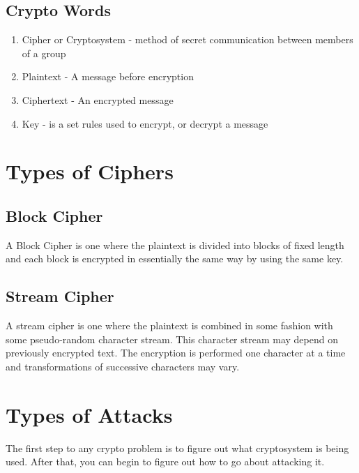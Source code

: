 \documentclass{report}
\begin{document}
\subsection{Crypto Words}
\begin{enumerate}
\item \color{blue}Cipher \color{black} or \color{blue}Cryptosystem \color{black} - method of secret communication between members of a group\newline
\item \color{blue}Plaintext \color{black} - A message before encryption\newline
\item \color{blue}Ciphertext \color{black} - An encrypted message\newline
\item \color{blue}Key \color{black} - is a set rules used to encrypt, or decrypt a message\newline
\end{enumerate}

\section{Types of Ciphers}
\subsection{Block Cipher}
A \color{blue}Block Cipher \color{black} is one where the plaintext is divided into blocks of fixed length and each block is encrypted in essentially the same way by using the same key.\newline
\newline
\subsection{Stream Cipher}
A \color{blue}stream cipher \color{black} is one where the plaintext is combined in some fashion with some pseudo-random character stream. This character stream may depend on previously encrypted text. The encryption is performed one character at a time and transformations of successive characters may vary.


\section{Types of Attacks}
The first step to any crypto problem is to figure out what cryptosystem is being used. After that, you can begin to figure out how to go about attacking it.
\end{document}
